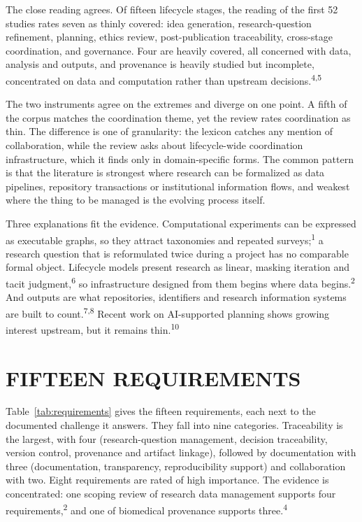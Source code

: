 \documentclass{IEEEcsmag}
\begin{document}
The close reading agrees. Of fifteen lifecycle stages, the reading of the first 52 studies rates seven as thinly covered: idea generation, research-question refinement, planning, ethics review, post-publication traceability, cross-stage coordination, and governance. Four are heavily covered, all concerned with data, analysis and outputs, and provenance is heavily studied but incomplete, concentrated on data and computation rather than upstream decisions.\textsuperscript{4,5}

The two instruments agree on the extremes and diverge on one point. A fifth of the corpus matches the coordination theme, yet the review rates coordination as thin. The difference is one of granularity: the lexicon catches any mention of collaboration, while the review asks about lifecycle-wide coordination infrastructure, which it finds only in domain-specific forms. The common pattern is that the literature is strongest where research can be formalized as data pipelines, repository transactions or institutional information flows, and weakest where the thing to be managed is the evolving process itself.

Three explanations fit the evidence. Computational experiments can be expressed as executable graphs, so they attract taxonomies and repeated surveys;\textsuperscript{1} a research question that is reformulated twice during a project has no comparable formal object. Lifecycle models present research as linear, masking iteration and tacit judgment,\textsuperscript{6} so infrastructure designed from them begins where data begins.\textsuperscript{2} And outputs are what repositories, identifiers and research information systems are built to count.\textsuperscript{7,8} Recent work on AI-supported planning shows growing interest upstream, but it remains thin.\textsuperscript{10}

\section{FIFTEEN REQUIREMENTS}

Table~\ref{tab:requirements} gives the fifteen requirements, each next to the documented challenge it answers. They fall into nine categories. Traceability is the largest, with four (research-question management, decision traceability, version control, provenance and artifact linkage), followed by documentation with three (documentation, transparency, reproducibility support) and collaboration with two. Eight requirements are rated of high importance. The evidence is concentrated: one scoping review of research data management supports four requirements,\textsuperscript{2} and one of biomedical provenance supports three.\textsuperscript{4}
\end{document}
